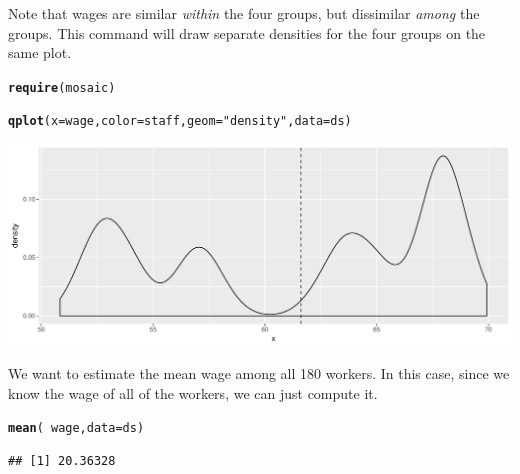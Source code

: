 \documentclass[10pt]{article}\usepackage[]{graphicx}\usepackage[]{color}
\makeatletter
\def\maxwidth{ %
  \ifdim\Gin@nat@width>\linewidth
    \linewidth
  \else
    \Gin@nat@width
  \fi
}
\newcommand{\hlstr}[1]{\textcolor[rgb]{0.192,0.494,0.8}{#1}}%
\newcommand{\hlopt}[1]{\textcolor[rgb]{0,0,0}{#1}}%
\newcommand{\hlstd}[1]{\textcolor[rgb]{0.345,0.345,0.345}{#1}}%
\newcommand{\hlkwc}[1]{\textcolor[rgb]{0.333,0.667,0.333}{#1}}%
\newcommand{\hlkwd}[1]{\textcolor[rgb]{0.737,0.353,0.396}{\textbf{#1}}}%
\newenvironment{kframe}{%
 \def\at@end@of@kframe{}%
 \ifinner\ifhmode%
  \def\at@end@of@kframe{\end{minipage}}%
  \begin{minipage}{\columnwidth}%
 \fi\fi%
 \def\FrameCommand##1{\hskip\@totalleftmargin \hskip-\fboxsep
 \colorbox{shadecolor}{##1}\hskip-\fboxsep
     \hskip-\linewidth \hskip-\@totalleftmargin \hskip\columnwidth}%
 \MakeFramed {\advance\hsize-\width
   \@totalleftmargin\z@ \linewidth\hsize
   \@setminipage}}%
 {\par\unskip\endMakeFramed%
 \at@end@of@kframe}
\newenvironment{knitrout}{}{} %
\makeatother
\begin{document}
Note that wages are similar \emph{within} the four groups, but dissimilar \emph{among} the groups. This command will draw separate densities for the four groups on the same plot. 

\begin{knitrout}
\color{fgcolor}\begin{kframe}
\begin{alltt}
\hlkwd{require}\hlstd{(mosaic)}
\end{alltt}


{\ttfamily\noindent\color{warningcolor}{\#\# Warning: package 'dplyr' was built under R version 3.4.1}}\begin{alltt}
\hlkwd{qplot}\hlstd{(}\hlkwc{x} \hlstd{= wage,} \hlkwc{color} \hlstd{= staff,} \hlkwc{geom} \hlstd{=} \hlstr{"density"}\hlstd{,} \hlkwc{data} \hlstd{= ds)}
\end{alltt}
\end{kframe}

{\centering \includegraphics[width=\maxwidth]{figure/unnamed-chunk-2-1} 

}



\end{knitrout}

We want to estimate the mean wage among all 180 workers. In this case, since we know the wage of all of the workers, we can just compute it. 
  
\begin{knitrout}
\color{fgcolor}\begin{kframe}
\begin{alltt}
\hlkwd{mean}\hlstd{(}\hlopt{~}\hlstd{wage,} \hlkwc{data} \hlstd{= ds)}
\end{alltt}
\begin{verbatim}
## [1] 20.36328
\end{verbatim}
\end{kframe}
\end{knitrout}
  
\end{document}
